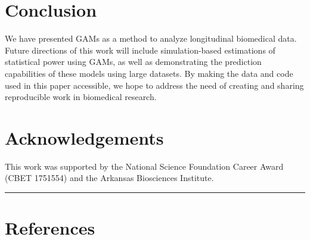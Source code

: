 \documentclass[
]{article}
\begin{document}
\FloatBarrier

\hypertarget{conclusion}{%
\section{Conclusion}\label{conclusion}}

We have presented GAMs as a method to analyze longitudinal biomedical data. Future directions of this work will include simulation-based estimations of statistical power using GAMs, as well as demonstrating the prediction capabilities of these models using large datasets.
By making the data and code used in this paper accessible, we hope to address the need of creating and sharing reproducible work in biomedical research.

\hypertarget{acknowledgements}{%
\section{Acknowledgements}\label{acknowledgements}}

This work was supported by the National Science Foundation Career Award (CBET 1751554) and the Arkansas Biosciences Institute.

\FloatBarrier

\begin{center}\rule{0.5\linewidth}{0.5pt}\end{center}

\newpage

\hypertarget{references}{%
\section{References}\label{references}}
\end{document}

